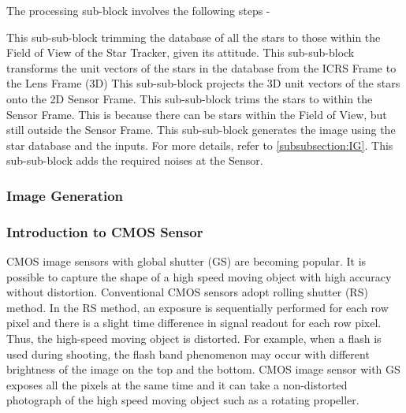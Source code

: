 \documentclass[../../main.tex]{subfiles}
\begin{document}
The processing sub-block involves the following steps -
\begin{enumerate}[label={}]
     This sub-sub-block trimming the database of all the stars to those within the Field of View of the Star Tracker, given its attitude. 
     This sub-sub-block transforms the unit vectors of the stars in the database from the ICRS Frame to the Lens Frame (3D)
     This sub-sub-block projects the 3D unit vectors of the stars onto the 2D Sensor Frame. 
     This sub-sub-block trims the stars to within the Sensor Frame. This is because there can be stars within the Field of View, but still outside the Sensor Frame. 
     This sub-sub-block generates the image using the star database and the inputs. For more details, refer to \ref{subsubsection:IG}.
     This sub-sub-block adds the required noises at the Sensor.
\end{enumerate}


\subsubsection{Image Generation \label{subsubsection:IG}}
\blindtext



\subsubsection{Introduction to CMOS Sensor}
CMOS image sensors with global shutter (GS) are becoming popular. It is possible to capture the shape of a high speed moving object with high accuracy without distortion. Conventional CMOS sensors adopt rolling shutter (RS) method. In the RS method, an exposure is sequentially performed for each row pixel and there is a slight time difference in signal readout for each row pixel. Thus, the high-speed moving object is distorted. For example, when a flash is used during shooting, the flash band phenomenon may occur with different brightness of the image on the top and the bottom. CMOS image sensor with GS exposes all the pixels at the same time and it can take a non-distorted photograph of the high speed moving object such as a rotating propeller. 
\end{document}
